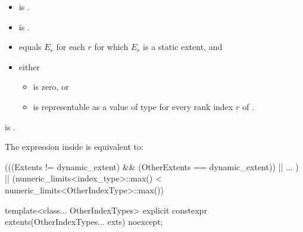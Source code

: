 \begin{itemdescr}
\pnum
\constraints
\begin{itemize}
\item
{} is .
\item
{} is .
\end{itemize}

\pnum
\expects
\begin{itemize}
\item
{} equals $E_r$
for each $r$ for which $E_r$ is a static extent, and
\item
either
\begin{itemize}
\item
{} is zero, or
\item
{} is representable as
a value of type  for every rank index $r$ of .
\end{itemize}
\end{itemize}

\pnum
\ensures
{} is .

\pnum
\remarks
The expression inside  is equivalent to:
\begin{codeblock}
(((Extents != dynamic_extent) && (OtherExtents == dynamic_extent)) || ... ) ||
(numeric_limits<index_type>::max() < numeric_limits<OtherIndexType>::max())
\end{codeblock}
\end{itemdescr}

%
\begin{itemdecl}
template<class... OtherIndexTypes>
  explicit constexpr extents(OtherIndexTypes... exts) noexcept;
\end{itemdecl}

